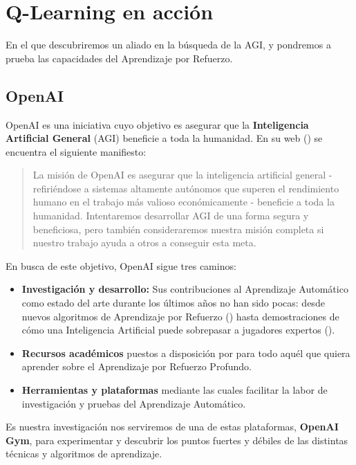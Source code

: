 \chapter{Q-Learning en acción}
\label{cap:q-learning}

En el que descubriremos un aliado en la búsqueda de la AGI, y pondremos a prueba las capacidades del Aprendizaje por Refuerzo.


\section{OpenAI}
OpenAI es una iniciativa cuyo objetivo es asegurar que la \textbf{Inteligencia Artificial General} (AGI) beneficie a toda la humanidad. En su web (\citet{OpenAI_charter}) se encuentra el siguiente manifiesto:

\begin{quote}
    La misión de OpenAI es asegurar que la inteligencia artificial general - refiriéndose a sistemas altamente autónomos que superen el rendimiento humano en el trabajo más valioso económicamente - beneficie a toda la humanidad. Intentaremos desarrollar AGI de una forma segura y beneficiosa, pero también consideraremos nuestra misión completa si nuestro trabajo ayuda a otros a conseguir esta meta. 
\end{quote}

En busca de este objetivo, OpenAI sigue tres caminos:
\begin{itemize}
    \item \textbf{Investigación y desarrollo:} Sus contribuciones al Aprendizaje Automático como estado del arte durante los últimos años no han sido pocas: desde nuevos algoritmos de Aprendizaje por Refuerzo (\citet{baselines}) hasta demostraciones de cómo una Inteligencia Artificial puede sobrepasar a jugadores expertos (\citet{OpenAI_dota}).
    \item \textbf{Recursos académicos} puestos a disposición por \citet{spinningup} para todo aquél que quiera aprender sobre el Aprendizaje por Refuerzo Profundo.
    \item \textbf{Herramientas y plataformas} mediante las cuales facilitar la labor de investigación y pruebas del Aprendizaje Automático.
\end{itemize}

Es nuestra investigación nos serviremos de una de estas plataformas, \textbf{OpenAI Gym}, para experimentar y descubrir los puntos fuertes y débiles de las distintas técnicas y algoritmos de aprendizaje. 

